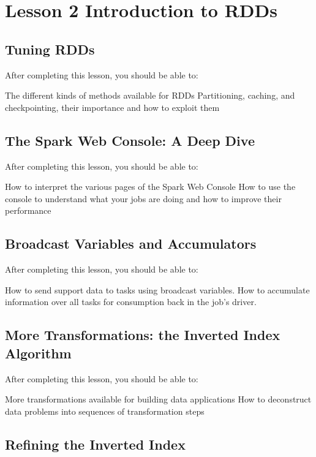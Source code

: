 \newpage
\section{Lesson 2 Introduction to RDDs}

\subsection{Tuning RDDs}

After completing this lesson, you should be able to:

The different kinds of methods available for RDDs
Partitioning, caching, and checkpointing, their importance and how to exploit them

\subsection{The Spark Web Console: A Deep Dive}

After completing this lesson, you should be able to:

How to interpret the various pages of the Spark Web Console
How to use the console to understand what your jobs are doing and how to improve their performance

\subsection{Broadcast Variables and Accumulators}

After completing this lesson, you should be able to:

How to send support data to tasks using broadcast variables.
How to accumulate information over all tasks for consumption back in the job’s driver.

\subsection{More Transformations: the Inverted Index Algorithm}

After completing this lesson, you should be able to:

More transformations available for building data applications
How to deconstruct data problems into sequences of transformation steps

\subsection{Refining the Inverted Index}

